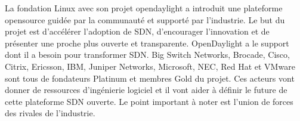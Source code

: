 
La fondation Linux avec son projet \gls{opendaylight} a introduit une plateforme \gls{opensource} guidée par la communauté et supporté par l'industrie. Le but du projet est d'accélérer l'adoption de SDN, d'encourager l'innovation et de présenter une proche plus ouverte et transparente. OpenDaylight a le support dont il a besoin pour transformer SDN. Big Switch Networks, Brocade, Cisco, Citrix, Ericsson, IBM, Juniper Networks, Microsoft, NEC, Red Hat et VMware sont tous de fondateurs Platinum et membres Gold du projet. Ces acteurs vont donner de ressources d'ingénierie logiciel et il vont aider à définir le future de cette plateforme SDN ouverte. Le point important à noter est l'union de forces des rivales de l'industrie. \cite{ExecutiveGuideToSDNLinux}







